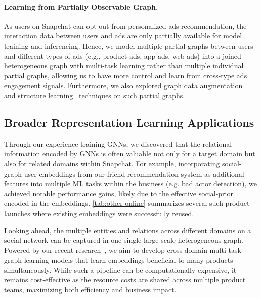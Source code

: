 \paragraph{Learning from Partially Observable Graph.}
As users on Snapchat can opt-out from personalized ads recommendation, the interaction data between users and ads are only partially available for model training and inferencing. Hence, we model multiple partial graphs between users and different types of ads (e.g., product ads, app ads, web ads) into a joined heterogeneous graph with multi-task learning rather than multiple individual partial graphs, allowing us to have more control and learn from cross-type ads engagement signals. Furthermore, we also explored graph data augmentation~\citep{zhao2021data} and structure learning~\citep{jin2020graph} techniques on such partial graphs.



\subsection{Broader Representation Learning Applications}
\label{sec:broader}

Through our experience training GNNs, we discovered that the relational information encoded by GNNs is often valuable not only for a target domain but also for related domains within Snapchat. For example, incorporating social-graph user embeddings from our friend recommendation system as additional features into multiple ML tasks within the business (e.g. bad actor detection), we achieved notable performance gains, likely due to the effective social-prior encoded in the embeddings. \cref{tab:other-online} summarizes several such product launches where existing embeddings were successfully reused.

Looking ahead, the multiple entities and relations across different domains on a social network can be captured in one single large-scale heterogeneous graph.
Powered by our recent research~\citep{ju2022multi}, we aim to develop cross-domain multi-task graph learning models that learn embeddings beneficial to many products simultaneously. While such a pipeline can be computationally expensive, it remains cost-effective as the resource costs are shared across multiple product teams, maximizing both efficiency and business impact.